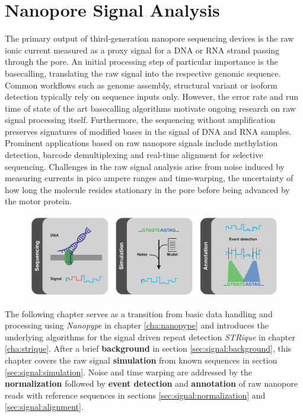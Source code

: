 \chapter{Nanopore Signal Analysis}
\label{cha:signal}

The primary output of third-generation nanopore sequencing devices is the raw ionic current measured as a proxy signal for a DNA or RNA strand passing through the pore. 
An initial processing step of particular importance is the basecalling, translating the raw signal into the respective genomic sequence.
Common workflows such as genome assembly, structural variant or isoform detection typically rely on sequence inputs only.
However, the error rate and run time of state of the art basecalling algorithms motivate ongoing research on raw signal processing itself. Furthermore, the sequencing without amplification preserves signatures of modified bases in the signal of DNA and RNA samples.
Prominent applications based on raw nanopore signals include methylation detection, barcode demultiplexing and real-time alignment for selective sequencing.
Challenges in the raw signal analysis arise from noise induced by measuring currents in pico ampere ranges and time-warping, the uncertainty of how long the molecule resides stationary in the pore before being advanced by the motor protein.


\begin{figure}[h]
    \centering
    \includegraphics[width=1.0\textwidth]{figures/signal/GA.pdf}
    \label{fig:signal:ga}
\end{figure}


The following chapter serves as a transition from basic data handling and processing using \textit{Nanopype} in chapter \ref{cha:nanopype} and introduces the underlying algorithms for the signal driven repeat detection \textit{STRique} in chapter \ref{cha:strique}.
After a brief \textbf{background} in section \ref{sec:signal:background}, this chapter covers the raw signal \textbf{simulation} from known sequences in section \ref{sec:signal:simulation}. Noise and time warping are addressed by the \textbf{normalization} followed by \textbf{event detection} and \textbf{annotation} of raw nanopore reads with reference sequences in sections \ref{sec:signal:normalization} and \ref{sec:signal:alignment}.

